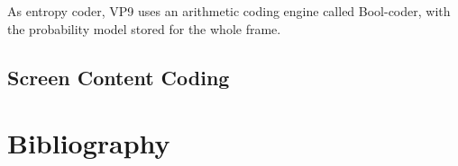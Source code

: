 \documentclass[a4paper,11pt,oneside]{article}
\begin{document}
\indent As entropy coder, VP9 uses an arithmetic coding engine called Bool-coder, with the probability model stored for the whole frame.\\

\subsection{Screen Content Coding}






\newpage
\section*{Bibliography}
\printbibliography
\end{document}
